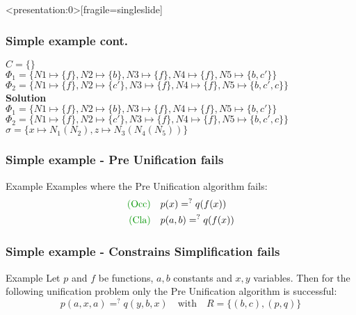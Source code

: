 		\begin{frame}<presentation:0>[fragile=singleslide]
	\frametitle{Simple example cont.}
	\(C=\{\}\)\\
	\(\Phi_1=\{N1\mapsto \{f\}, N2\mapsto \{b\}, N3\mapsto \{f\} , N4\mapsto \{f\},N5\mapsto \{b,c'\}\}\)\\
	\(\Phi_2=\{N1\mapsto \{f\}, N2\mapsto \{c'\}, N3\mapsto \{f\} , N4\mapsto \{f\},N5\mapsto \{b,c',c\}\}\)\\
	
	\vspace{0.5cm}
	\textbf{Solution}\\
	\(\Phi_1=\{N1\mapsto \{f\}, N2\mapsto \{b\}, N3\mapsto \{f\} , N4\mapsto \{f\},N5\mapsto \{b,c'\}\}\)\\
	\(\Phi_2=\{N1\mapsto \{f\}, N2\mapsto \{c'\}, N3\mapsto \{f\} , N4\mapsto \{f\},N5\mapsto \{b,c',c\}\}\)\\
	\(\sigma=\{x \mapsto N_1(N_2), z \mapsto N_3(N_4(N_5))\}\)\\
		\end{frame}
		
	\begin{frame}[fragile=singleslide]
	\frametitle{Simple example - Pre Unification fails}
	\begin{exampleblock}{Example}
	Examples where the Pre Unification algorithm fails:
		\begin{gather}
		\begin{align}
				\text{\textcolor[rgb]{0,0.58,0}{(Occ)}}\quad & p(x) =^? q(f(x))\\
				\text{\textcolor[rgb]{0,0.58,0}{(Cla)}}\quad & p(a,b) =^? q(f(x))
		\end{align}
		\end{gather}
	\end{exampleblock}
		\vspace{0.5cm}
		\end{frame}
	
	\begin{frame}[fragile=singleslide]
	\frametitle{Simple example - Constrains Simplification fails}		
	\begin{exampleblock}{Example}
	Let $p$ and $f$ be functions, $a,b$ constants and $x,y$ variables. Then for the following unification problem only the Pre Unification algorithm is successful:
	\[p(a,x,a) =^? q(y,b,x) \quad \text{with} \quad R=\{(b,c),(p,q)\}\]\\
	\end{exampleblock}
	\end{frame}
	
